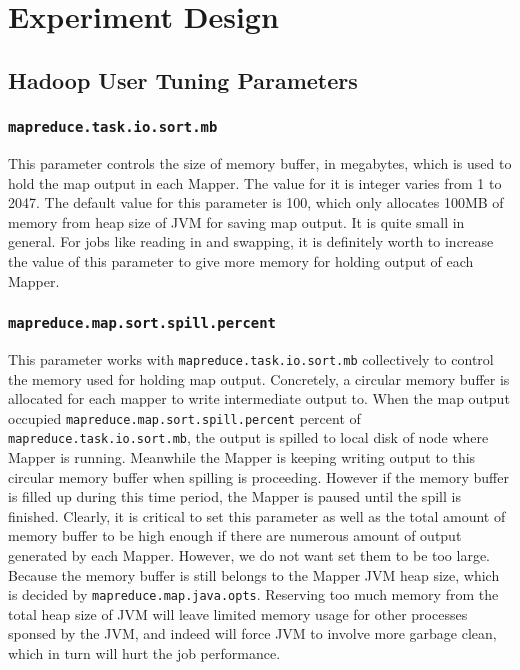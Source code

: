 \section{Experiment Design}

\subsection{Hadoop User Tuning Parameters}

\subsubsection{\texttt{mapreduce.task.io.sort.mb}}

This parameter controls the size of memory buffer, in megabytes, which is used 
to hold the map output in each Mapper. The value for it is integer varies from 1 
to 2047. The default value for this parameter is 100, which only allocates 100MB
of memory from heap size of JVM for saving map output. It is quite small in 
general. For jobs like reading in and swapping, it is definitely worth to increase
the value of this parameter to give more memory for holding output of each Mapper.

\subsubsection{\texttt{mapreduce.map.sort.spill.percent}}

This parameter works with \texttt{mapreduce.task.io.sort.mb} collectively to 
control the memory used for holding map output. Concretely, a circular memory 
buffer is allocated for each mapper to write intermediate output to. When the 
map output occupied \texttt{mapreduce.map.sort.spill.percent} percent of \\
\texttt{mapreduce.task.io.sort.mb}, the output is spilled to local disk of node
where Mapper is running. Meanwhile the Mapper is keeping writing output to this
circular memory buffer when spilling is proceeding. However if the memory buffer
is filled up during this time period, the Mapper is paused until the spill is
finished. Clearly, it is critical to set this parameter as well as the total 
amount of memory buffer to be high enough if there are numerous amount of output
generated by each Mapper. However, we do not want set them to be too large.
Because the memory buffer is still belongs to the Mapper JVM heap size, which is
decided by \texttt{mapreduce.map.java.opts}. Reserving too much memory from the
total heap size of JVM will leave limited memory usage for other processes sponsed
by the JVM, and indeed will force JVM to involve more garbage clean, which in 
turn will hurt the job performance.    

